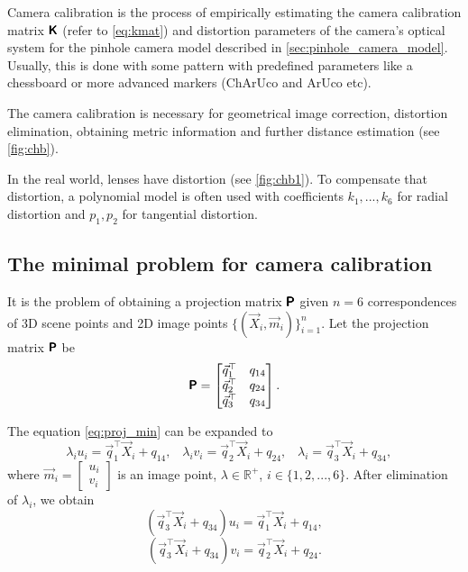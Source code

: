 Camera calibration is the process of empirically estimating the camera calibration matrix $\pmb{\mathsf{K}}$ (refer to \eqref{eq:kmat}) and distortion parameters of the camera's optical system for the pinhole camera model described in \autoref{sec:pinhole_camera_model}.
Usually, this is done with some pattern with predefined parameters like a chessboard or more advanced markers (ChArUco and ArUco \cite{aruco} etc).

The camera calibration is necessary for geometrical image correction, distortion elimination, obtaining metric information and further distance estimation (see \autoref{fig:chb}). 

In the real world, lenses have distortion (see \autoref{fig:chb1}).
To compensate that distortion, a polynomial model is often used with coefficients $k_1, ... , k_6$ for radial distortion and $p_1, p_2$ for tangential distortion.

\subsection{The minimal problem for camera calibration} 
It is the problem of obtaining a projection matrix $\pmb{\mathsf{P}}$ given $n=6$ correspondences of 3D scene points and 2D image points $\{(\vec{X}_i, \vec{m}_i)\}_{i=1}^n$.
Let the projection matrix $\pmb{\mathsf{P}}$ be 
\begin{equation}
    \label{eq:p_calib}
    \pmb{\mathsf{P}} = \begin{bmatrix}
        \vec{q}_1^\top & q_{14} \\
        \vec{q}_2^\top & q_{24} \\
        \vec{q}_3^\top & q_{34} \\
    \end{bmatrix}.
\end{equation}

The equation \eqref{eq:proj_min} can be expanded to
\begin{equation}
    \lambda_i u_i = \vec{q}_1^\top \vec{X}_i + q_{14}, \;\;\;
    \lambda_i v_i = \vec{q}_2^\top \vec{X}_i + q_{24}, \;\;\;
    \lambda_i = \vec{q}_3^\top \vec{X}_i + q_{34}, \;\;\;
\end{equation}
where $\vec{m}_i = \begin{bmatrix} u_i \\ v_i \end{bmatrix}$ is an image point, $ \lambda \in \mathbb{R}^{+}$, $i \in \{1, 2, ..., 6\}$.
After elimination of $\lambda_i$, we obtain
\begin{equation}
    (\vec{q}_3^\top \vec{X}_i + q_{34})u_i = \vec{q}_1^\top \vec{X}_i + q_{14},
\end{equation}
\begin{equation}
    (\vec{q}_3^\top \vec{X}_i + q_{34})v_i = \vec{q}_2^\top \vec{X}_i + q_{24}.
\end{equation}

